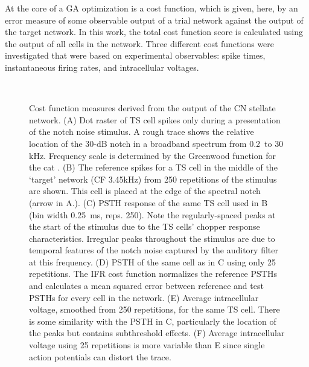 At the core of a GA optimization is a cost function, which is given,
here, by an error measure of some observable output of a trial network
against the output of the target network. In this work, the total cost
function score is calculated using the output of all cells in the
network.  Three different cost functions were investigated that were
based on experimental observables: spike times, instantaneous firing
rates, and intracellular voltages.


\begin{figure}[pt!]
  \begin{center}
    \\
    \vspace{0.1in}
\end{center}
  \caption{Cost function measures derived from the output of the CN
    stellate network. (A) Dot raster of TS cell spikes only during a
    presentation of the notch noise stimulus. A rough trace shows
    the relative location of the 30-dB notch in a broadband spectrum
    from 0.2~to 30 kHz. Frequency scale is determined by the
    Greenwood function for the cat \cite{Greenwood:1990}. (B) The
    reference spikes for a TS cell in the middle of the `target'
    network (CF 3.45kHz) from 250 repetitions of the stimulus are
    shown. This cell is placed at the edge of the spectral notch
    (arrow in A.). (C) PSTH response of the same TS cell used in B
    (bin width 0.25~ms, reps. 250). Note the regularly-spaced peaks
    at the start of the stimulus due to the TS cells' chopper
    response characteristics. Irregular peaks throughout the
    stimulus are due to temporal features of the notch noise
    captured by the auditory filter at this frequency. (D) PSTH of
    the same cell as in C using only 25 repetitions. The IFR cost
    function normalizes the reference PSTHs and calculates a mean
    squared error between reference and test PSTHs for every cell in
    the network. (E) Average intracellular voltage, smoothed from
    250 repetitions, for the same TS cell. There is some similarity
    with the PSTH in C, particularly the location of the peaks but
    contains subthreshold effects. (F) Average intracellular voltage
    using 25 repetitions is more variable than E since single action
    potentials can distort the trace.}
\label{fig:GA:Costfunctions}
\end{figure}
\clearpage


